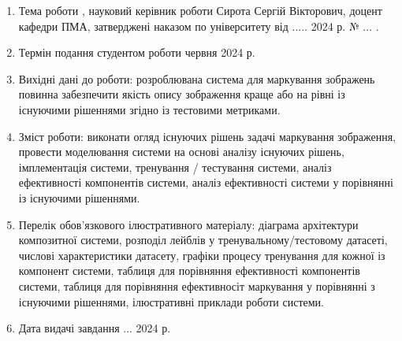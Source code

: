 \documentclass{udstu}
\begin{document}

\begin{enumerate}[1.]
	\item Тема роботи ,
	науковий керівник роботи Сирота Сергій Вікторович, доцент кафедри ПМА, затверджені наказом по університету
	від  ..... 2024 р. № ... .

	\item Термін подання студентом роботи  червня 2024 р.

	\item Вихідні дані до роботи: розроблювана система для маркування зображень повинна
	забезпечити якість опису зображення краще або на рівні із існуючими рішеннями згідно із
	тестовими метриками.

	\item Зміст роботи: виконати огляд існуючих рішень задачі маркування зображення,
	провести моделювання системи на основі аналізу існуючих рішень, імплементація системи,
	тренування / тестування системи, аналіз ефективності компонентів системи,
	аналіз ефективності системи у порівнянні із існуючими рішеннями.

	\item Перелік обов'язкового ілюстративного матеріалу: діаграма архітектури композитної системи,
	розподіл лейблів у тренувальному/тестовому датасеті, числові характеристики датасету,
	графіки процесу тренування для кожної із компонент системи,
	таблиця для порівняння ефективності компонентів системи,
	таблиця для порівняння ефективносіт маркування у порівнянні з існуючими рішеннями,
	ілюстративні приклади роботи системи.

	\item Дата видачі завдання  ... 2024 р.
\end{enumerate}
\end{document}
